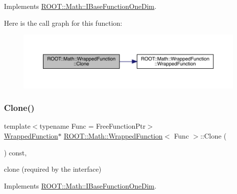 Implements \mbox{\hyperlink{classROOT_1_1Math_1_1IBaseFunctionOneDim_a656dbb4dfc43e8d1566442bfb1a717fd}{R\+O\+O\+T\+::\+Math\+::\+I\+Base\+Function\+One\+Dim}}.

Here is the call graph for this function\+:
\nopagebreak
\begin{figure}[H]
\begin{center}
\leavevmode
\includegraphics[width=350pt]{de/d34/classROOT_1_1Math_1_1WrappedFunction_a4ec89f0c717b0fc228ebe7d71e14b1ee_cgraph}
\end{center}
\end{figure}
\mbox{\label{classROOT_1_1Math_1_1WrappedFunction_a4ec89f0c717b0fc228ebe7d71e14b1ee}} 
\subsubsection{\texorpdfstring{Clone()}{Clone()}\hspace{0.1cm}{\footnotesize\ttfamily [2/3]}}
{\footnotesize\ttfamily template$<$typename Func  = Free\+Function\+Ptr$>$ \\
\mbox{\hyperlink{classROOT_1_1Math_1_1WrappedFunction}{Wrapped\+Function}}$\ast$ \mbox{\hyperlink{classROOT_1_1Math_1_1WrappedFunction}{R\+O\+O\+T\+::\+Math\+::\+Wrapped\+Function}}$<$ Func $>$\+::Clone (\begin{DoxyParamCaption}{ }\end{DoxyParamCaption}) const\hspace{0.3cm}{\ttfamily [inline]}, {\ttfamily [virtual]}}



clone (required by the interface) 



Implements \mbox{\hyperlink{classROOT_1_1Math_1_1IBaseFunctionOneDim_a656dbb4dfc43e8d1566442bfb1a717fd}{R\+O\+O\+T\+::\+Math\+::\+I\+Base\+Function\+One\+Dim}}.


